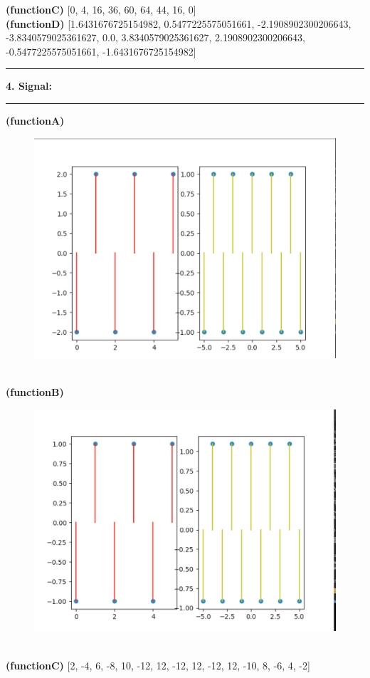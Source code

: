 \documentclass[11pt]{article}
\newcommand\question[2]{\vspace{.25in}\hrule\textbf{#1: #2}\vspace{.5em}\hrule\vspace{.10in}}
\renewcommand\part[1]{\vspace{.10in}\textbf{(#1)}}
\begin{document}
     \part{functionC} [0, 4, 16, 36, 60, 64, 44, 16, 0]\\
     \part{functionD} [1.6431676725154982, 0.5477225575051661, -2.1908902300206643, -3.8340579025361627, 0.0, 3.8340579025361627, 2.1908902300206643, -0.5477225575051661, -1.6431676725154982]\\
     \cleardoublepage
     \question{4. Signal}{}
     \part{functionA}
     \begin{figure}[h]
         \centering
         \includegraphics[width=0.5\linewidth]{figures/4a.png}
         \label{fig:4a}
     \end{figure}\\
     \part{functionB}
     \begin{figure}[h]
         \centering
         \includegraphics[width=0.5\linewidth]{figures/4b.png}
         \label{fig:4b}
     \end{figure}\\
     \part{functionC} [2, -4, 6, -8, 10, -12, 12, -12, 12, -12, 12, -10, 8, -6, 4, -2]\\
\end{document}
